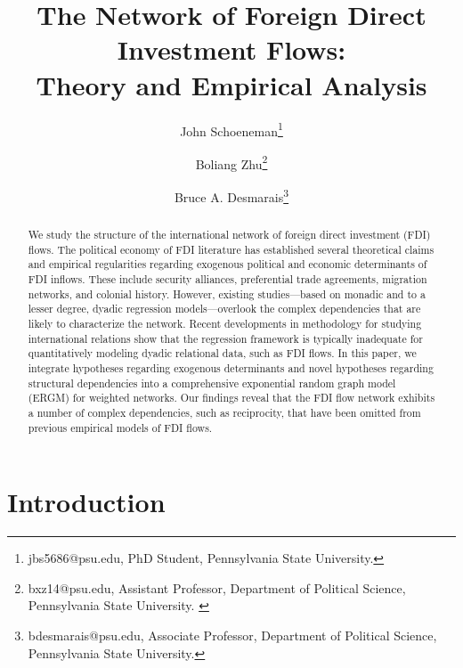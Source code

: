 \documentclass{article}
\begin{document}
\title{The Network of Foreign Direct Investment Flows: \\Theory and Empirical Analysis}
\author{John  Schoeneman\thanks{\footnotesize{
jbs5686@psu.edu, PhD Student, Pennsylvania State University.}} \and Boliang Zhu\thanks{\footnotesize{bxz14@psu.edu, Assistant Professor, Department of Political Science, Pennsylvania State University. }} \and Bruce A. Desmarais\thanks{\footnotesize{
bdesmarais@psu.edu, Associate Professor, Department of Political Science, Pennsylvania State University.}}}
\date{}
\maketitle

\singlespacing
\begin{abstract} 
    \noindent We study the structure of the international network of foreign direct investment (FDI) flows. The political economy of FDI literature has established several theoretical claims and empirical regularities regarding exogenous political and economic determinants of FDI inflows. These include security alliances, preferential trade agreements, migration networks, and colonial history. However, existing studies---based on monadic and to a lesser degree, dyadic regression models---overlook the complex dependencies that are likely to characterize the network. Recent developments in methodology for studying international relations show that the regression framework is typically inadequate for quantitatively modeling dyadic relational data, such as FDI flows. In this paper, we integrate hypotheses regarding exogenous determinants and novel hypotheses regarding structural dependencies into a comprehensive exponential random graph model (ERGM) for weighted networks. Our findings reveal that the FDI flow network  exhibits a number of complex dependencies, such as reciprocity, that have been omitted from previous empirical models of FDI flows.

\end{abstract}

\section{Introduction}
\end{document}
